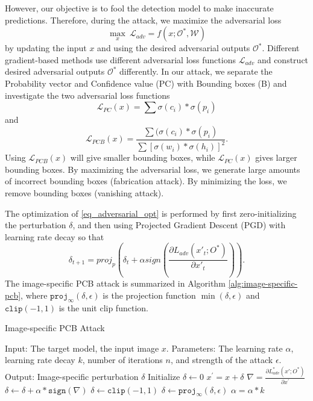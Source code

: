However, our objective is to fool the detection model to make inaccurate predictions. Therefore, during the attack, we maximize the adversarial loss 
\begin{equation}
\label{eq_adversarial_opt}
\max_{x} \ \mathcal{L}_{adv} = f(x; \mathcal{O}^{\ast}, \mathcal{W})
\end{equation}
by updating the input $x$ and using the desired adversarial outputs $\mathcal{O}^{\ast}$. Different gradient-based methods use different adversarial loss functions $\mathcal{L}_{adv}$ and construct desired adversarial outputs $\mathcal{O}^{\ast}$ differently. In our attack, we separate the Probability vector and Confidence value (PC) with Bounding boxes (B) and investigate the two adversarial loss functions
\begin{equation}
\mathcal{L}_{PC}(x) = \sum{\sigma(c_i) * \sigma(p_i)}
\end{equation}
and
\begin{equation}
\mathcal{L}_{PCB}(x) = \frac{\sum{(\sigma(c_i) * \sigma(p_i)}}{\sum{[\sigma(w_i) * \sigma(h_i)]^2}}.
\end{equation}
Using $\mathcal{L}_{PCB}(x)$ will give smaller bounding boxes, while $\mathcal{L}_{PC}(x)$ gives larger bounding boxes. By maximizing the adversarial loss, we generate large amounts of incorrect bounding boxes (fabrication attack). By minimizing the loss, we remove bounding boxes (vanishing attack).

The optimization of \eqref{eq_adversarial_opt} is performed by first zero-initializing the perturbation $\delta$, and then using Projected Gradient Descent (PGD) \cite{madry2017towards} with learning rate decay so that 
\begin{equation}
\delta_{t+1} = proj_p(\delta_{t} + \alpha sign(\frac{\partial L_{adv}(x'_{t};O^*)}{\partial x'_{t}} )).
\end{equation}
The image-specific PCB attack is summarized in Algorithm \ref{alg:image-specific-pcb}, where 
$\texttt{proj}_{\infty}(\delta,\epsilon)$ is the projection function $\min(\delta,\epsilon)$ and $\texttt{clip}(-1, 1)$ is the unit clip function.

\begin{algorithm}
    \caption{Image-specific PCB Attack}\label{alg:image-specific-pcb}
    \begin{algorithmic}
        \STATE Input: The target model, the input image $x$.
        \STATE Parameters: The learning rate $\alpha$, learning rate decay $k$, number of iterations $n$, and strength of the attack $\epsilon$.
        \STATE Output: Image-specific perturbation $\delta$
        \STATE Initialize $\delta \leftarrow 0$
            \STATE $x^{'} = x + \delta$  
            \STATE $\nabla = \frac{\partial L_{adv}^*(x';O^*)}{\partial x^{'}}$
            \STATE $\delta \leftarrow \delta + \alpha * \texttt{sign}(\nabla)$
            \STATE $\delta \leftarrow \texttt{clip}(-1, 1)$
            \STATE $\delta \leftarrow  \texttt{proj}_{\infty}(\delta,\epsilon)$ 
            \STATE $\alpha = \alpha * k$ %
        \ENDFOR
    \end{algorithmic}
\end{algorithm}

